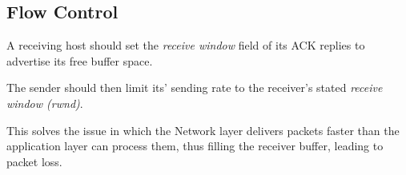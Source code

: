 \subsection{Flow Control}

A receiving host should set the \textit{receive window}
field of its ACK replies to advertise its free buffer space.

The sender should then limit its' sending rate to the receiver's
stated \textit{receive window (rwnd)}.

This solves the issue in which the Network layer delivers packets faster
than the application layer can process them, thus filling
the receiver buffer, leading to packet loss.